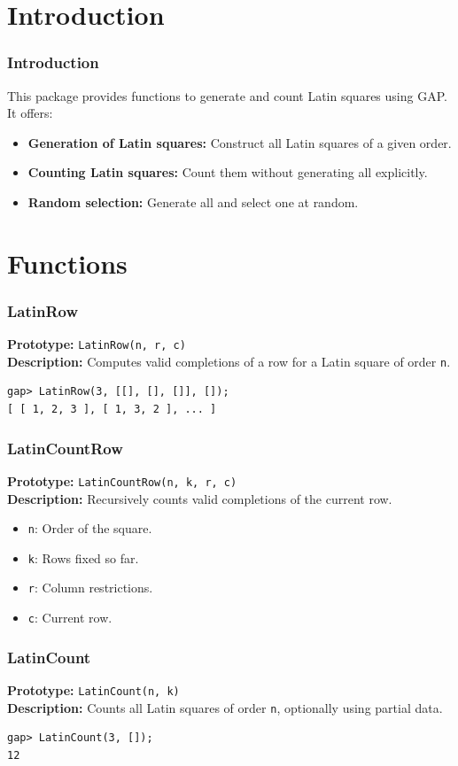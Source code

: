 \documentclass{beamer}
\begin{document}
\section{Introduction}
\begin{frame}
\frametitle{Introduction}
This package provides functions to generate and count Latin squares using GAP. It offers:
\begin{itemize}
  \item \textbf{Generation of Latin squares:} Construct all Latin squares of a given order.
  \item \textbf{Counting Latin squares:} Count them without generating all explicitly.
  \item \textbf{Random selection:} Generate all and select one at random.
\end{itemize}
\end{frame}

\section{Functions}
\begin{frame}[fragile]
\frametitle{LatinRow}
\textbf{Prototype:} \texttt{LatinRow(n, r, c)}\\
\textbf{Description:} Computes valid completions of a row for a Latin square of order \texttt{n}.
\begin{lstlisting}
gap> LatinRow(3, [[], [], []], []);
[ [ 1, 2, 3 ], [ 1, 3, 2 ], ... ]
\end{lstlisting}
\end{frame}

\begin{frame}[fragile]
\frametitle{LatinCountRow}
\textbf{Prototype:} \texttt{LatinCountRow(n, k, r, c)}\\
\textbf{Description:} Recursively counts valid completions of the current row.
\begin{itemize}
  \item \texttt{n}: Order of the square.
  \item \texttt{k}: Rows fixed so far.
  \item \texttt{r}: Column restrictions.
  \item \texttt{c}: Current row.
\end{itemize}
\end{frame}

\begin{frame}[fragile]
\frametitle{LatinCount}
\textbf{Prototype:} \texttt{LatinCount(n, k)}\\
\textbf{Description:} Counts all Latin squares of order \texttt{n}, optionally using partial data.
\begin{lstlisting}
gap> LatinCount(3, []);
12
\end{lstlisting}
\end{frame}
\end{document}
